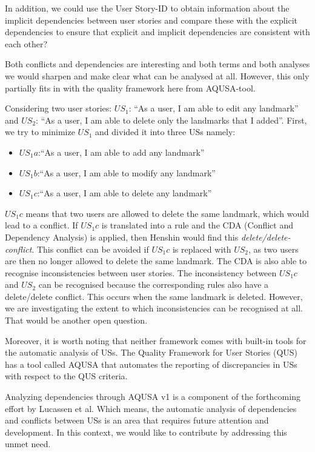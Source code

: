 In addition, we could use the User Story-ID to obtain information about the implicit dependencies between user stories and compare these with the explicit dependencies to ensure that explicit and implicit dependencies are consistent with each other?

Both conflicts and dependencies are interesting and both terms and both analyses we would sharpen  and make clear what can be analysed at all. However, this only partially fits in with the quality framework here from AQUSA-tool.

\begin{example}
Considering two user stories:  $US_1$: \enquote{As a user, I am able to edit any landmark} and $US_2$: \enquote{As a user, I am able to delete only the landmarks that I added}. First, we try to minimize $US_1$ and divided it into three USs namely:
\begin{itemize}
\item $US_1a$:\enquote{As a user, I am able to add any landmark}
\item $US_1b$:\enquote{As a user, I am able to modify any landmark}
\item $US_1c$:\enquote{As a user, I am able to delete any landmark}
\end{itemize}
$US_1c$ means that two users are allowed to delete the same landmark, which would lead to a conflict. If $US_1c$ is translated into a rule and the CDA (Conflict and Dependency Analysis) is applied, then Henshin would find this \emph{delete/delete-conflict}. This conflict can be avoided if $US_1c$ is replaced with $US_2$, as two users are then no longer allowed to delete the same landmark.
The CDA is also able to recognise inconsistencies between user stories. The inconsistency between $US_1c$ and $US_2$ can be recognised because the corresponding rules also have a delete/delete conflict. This occurs when the same landmark is deleted. However, we are investigating the extent to which inconsistencies can be recognised at all. That would be another open question.
\end{example}

Moreover, it is worth noting that neither framework comes with built-in tools for the automatic analysis of USs. %
The Quality Framework for User Stories (QUS) has a tool called AQUSA that automates the reporting of discrepancies in USs with respect to the QUS criteria. 

Analyzing dependencies through AQUSA v1 is a component of the forthcoming effort by Lucassen et al. Which means, the automatic analysis of dependencies and conflicts between USs is an area that requires future attention and development. In this context, we would like to contribute by addressing this unmet need.
